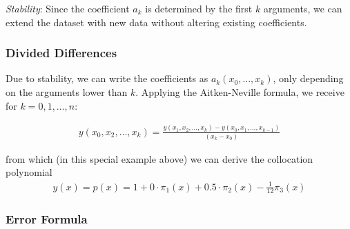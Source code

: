 \emph{Stability}: Since the coefficient $a_k$ is determined by the first $k$ arguments,
we can extend the dataset with new data without altering existing coefficients.

\subsubsection{Divided Differences}

Due to stability, we can write the coefficients as $a_k(x_0,\ldots,x_k)$, only depending on the arguments lower than $k$.
Applying the Aitken-Neville formula, we receive for $k=0,1,\ldots,n$:

\begin{align*}
	y(x_0, x_2, \ldots, x_k)=\frac{y(x_1,x_2,\ldots,x_k) - y(x_0, x_1, \ldots, x_{k-1})}{(x_k - x_0)}
\end{align*}



from which (in this special example above) we can derive the collocation polynomial
\begin{align*}
	y(x)=p(x)=1+0\cdot\pi_1(x)+0.5\cdot\pi_2(x)-\frac{1}{12}\pi_3(x)
\end{align*}

\subsubsection{Error Formula}

